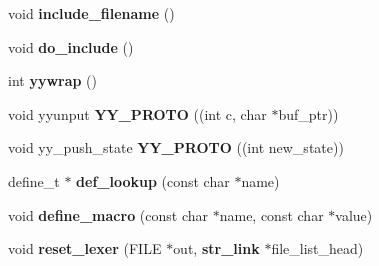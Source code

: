 \begin{CompactItemize}
\item 
void {\bf include\_\-filename} ()
\item 
void {\bf do\_\-include} ()
\item 
int {\bf yywrap} ()
\item 
void yyunput {\bf YY\_\-PROTO} ((int c, char $\ast$buf\_\-ptr))
\item 
void yy\_\-push\_\-state {\bf YY\_\-PROTO} ((int new\_\-state))
\item 
define\_\-t $\ast$ {\bf def\_\-lookup} (const char $\ast$name)
\item 
void {\bf define\_\-macro} (const char $\ast$name, const char $\ast$value)
\item 
void {\bf reset\_\-lexer} (FILE $\ast$out, {\bf str\_\-link} $\ast$file\_\-list\_\-head)
\end{CompactItemize}
